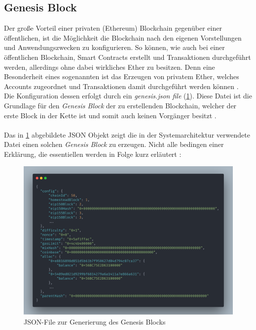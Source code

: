 \subsection{Genesis Block}
\label{subsec:genesis}
Der große Vorteil einer privaten (Ethereum) Blockchain gegenüber einer öffentlichen, ist die Möglichkeit die Blockchain nach den eigenen Vorstellungen und Anwendungszwecken zu konfigurieren. So können, wie auch bei einer öffentlichen Blockchain, Smart Contracts erstellt und Transaktionen durchgeführt werden, allerdings ohne dabei wirkliches Ether zu besitzen. Denn eine Besonderheit eines sogenannten  ist das Erzeugen von privatem Ether, welches Accounts zugeordnet und Transaktionen damit durchgeführt werden können \cite{Bchain:PubVsPrivate}.\\
Die Konfiguration dessen erfolgt durch ein \textit{genesis.json file} (\ref{img:gen}). Diese Datei ist die Grundlage für den \textit{Genesis Block} der zu erstellenden Blockchain, welcher der erste Block in der Kette ist und somit auch keinen Vorgänger besitzt \cite{MasteringBlockchain}.\\\\
Das in \ref{img:gen} abgebildete JSON Objekt zeigt die in der Systemarchitektur verwendete Datei einen solchen \textit{Genesis Block} zu erzeugen. Nicht alle  bedingen einer Erklärung, die essentiellen werden in Folge kurz erläutert \cite{MasteringBlockchain, Eth:GenFile}: 
\newpage
\begin{figure}[th!]
	\centering
	\includegraphics[width=.9\columnwidth]{./Abbildungen/Kapitel_03/genesis.json.png}
	\caption[genesis.json]{JSON-File zur Generierung des Genesis Blocks}
	\label{img:gen}
\end{figure}

